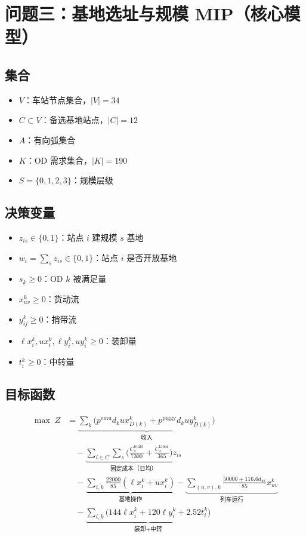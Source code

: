 \documentclass[12pt,a4paper,fontset=none]{ctexart}
\begin{document}
\section*{问题三：基地选址与规模 MIP（核心模型）}

\subsection*{集合}
\begin{itemize}
    \item $V$：车站节点集合，$|V|=34$
    \item $C \subset V$：备选基地站点，$|C|=12$
    \item $A$：有向弧集合
    \item $K$：OD 需求集合，$|K|=190$
    \item $S = \{0,1,2,3\}$：规模层级
\end{itemize}

\subsection*{决策变量}
\begin{itemize}
    \item $z_{is} \in \{0,1\}$：站点 $i$ 建规模 $s$ 基地
    \item $w_i = \sum_s z_{is} \in \{0,1\}$：站点 $i$ 是否开放基地
    \item $s_k \geq 0$：OD $k$ 被满足量
    \item $x_{uv}^k \geq 0$：货动流
    \item $y_{ij}^k \geq 0$：捎带流
    \item $\ell x_i^k, ux_i^k, \ell y_i^k, uy_i^k \geq 0$：装卸量
    \item $t_i^k \geq 0$：中转量
\end{itemize}

\subsection*{目标函数}
\begin{align}
\max\; Z &= \underbrace{\sum_{k} \big(p^{\text{emu}} d_k ux_{D(k)}^k + p^{\text{piggy}} d_k uy_{D(k)}^k\big)}_{\text{收入}} \nonumber\\
&\quad - \underbrace{\sum_{i \in C} \sum_s \big(\frac{C_s^{\text{build}}}{7300} + \frac{C_s^{\text{labor}}}{365}\big) z_{is}}_{\text{固定成本（日均）}} \nonumber\\
&\quad - \underbrace{\sum_{i,k} \frac{22000}{85}(\ell x_i^k + ux_i^k)}_{\text{基地操作}} - \underbrace{\sum_{(u,v),k} \frac{50000+116.6d_{uv}}{85} x_{uv}^k}_{\text{列车运行}} \nonumber\\
&\quad - \underbrace{\sum_{i,k} \big(144\ell x_i^k + 120\ell y_i^k + 2.52 t_i^k\big)}_{\text{装卸+中转}} \label{eq:obj}
\end{align}
\end{document}
